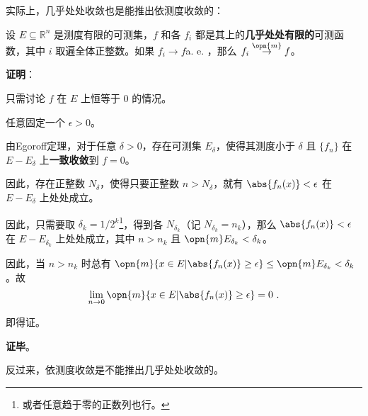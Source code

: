 实际上，几乎处处收敛也是能推出依测度收敛的：

\begin{theorem}{}\label{the_LimMs_1}

设 $E\subseteq \mathbb{R}^n$ 是测度有限的可测集，$f$ 和各 $f_i$ 都是其上的\textbf{几乎处处有限的}可测函数，其中 $i$ 取遍全体正整数。如果 $f_i\to f $a. e. ，那么 $f_i\overset{\opn{m}}\to f$。



\end{theorem}

\textbf{证明}：

只需讨论 $f$ 在 $E$ 上恒等于 $0$ 的情况。

任意固定一个 $\epsilon>0$。

由Egoroff定理，对于任意 $\delta>0$，存在可测集 $E_\delta$，使得其测度小于 $\delta$ 且 $\{f_n\}$ 在 $E-E_\delta$ 上\textbf{一致收敛}到 $f=0$。

因此，存在正整数 $N_\delta$，使得只要正整数 $n>N_\delta$，就有 $\abs{f_n(x)}<\epsilon$ 在 $E-E_\delta$ 上处处成立。

因此，只需要取 $\delta_k=1/2^k$\footnote{或者任意趋于零的正数列也行。}，得到各 $N_{\delta_k}$（记 $N_{\delta_k}=n_k$），那么 $\abs{f_{n}(x)}<\epsilon$ 在 $E-E_{\delta_k}$ 上处处成立，其中 $n>n_k$ 且 $\opn{m}E_{\delta_k}<{\delta_k}$。

因此，当 $n>n_k$ 时总有 $\opn{m}\{x\in E|\abs{f_n(x)}\geq\epsilon\}\leq\opn{m}E_{\delta_k}<\delta_k$。故
\begin{equation}
\lim\limits_{n\to 0}\opn{m}\{x\in E|\abs{f_n(x)}\geq\epsilon\}=0~.
\end{equation}

即得证。

\textbf{证毕}。


反过来，依测度收敛是不能推出几乎处处收敛的。

